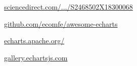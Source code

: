 \begin{description}[font=\normalfont,itemsep=0pt]
    \item[Paper]
        \href{https://www.sciencedirect.com/science/article/pii/S2468502X18300068}{sciencedirect.com/.../S2468502X18300068}

    \item[Github]
        \href{https://github.com/ecomfe/awesome-echarts}{github.com/ecomfe/awesome-echarts}

    \item[Apache]
        \href{http://echarts.apache.org/}{echarts.apache.org/}

    \item[Gallery]
        \href{https://gallery.echartsjs.com/}{gallery.echartsjs.com}

\end{description}
